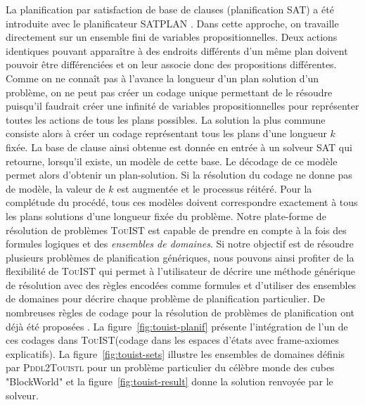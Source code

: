 \documentclass{jfpda2014}
\newcommand{\nameTool}{\textsc{TouIST}\xspace}
\newcommand{\pddlmodule}{\textsc{Pddl2Touistl}\xspace}
\begin{document}
La planification par satisfaction de base de clauses (planification SAT) a été introduite avec le planificateur SATPLAN \citep{kautzS92_planning_sat}. Dans cette approche, on travaille directement sur un ensemble fini de variables propositionnelles. Deux actions identiques pouvant apparaître à des endroits différents d'un même plan doivent pouvoir être différenciées et on leur associe donc des propositions différentes. Comme on ne connaît pas à l'avance la longueur d'un plan solution d'un problème, on ne peut pas créer un codage unique permettant de le résoudre puisqu'il faudrait créer une infinité de variables propositionnelles pour représenter toutes les actions de tous les plans possibles. La solution la plus commune consiste alors à créer un codage représentant tous les plans d'une longueur $k$ fixée. La base de clause ainsi obtenue est donnée en entrée à un solveur SAT qui retourne, lorsqu'il existe, un modèle de cette base. Le décodage de ce modèle permet alors d'obtenir un plan-solution. Si la résolution du codage ne donne pas de modèle, la valeur de $k$ est augmentée et le processus réitéré. Pour la complétude du procédé, tous ces modèles doivent correspondre exactement à tous les plans solutions d'une longueur fixée du problème.
Notre plate-forme de résolution de problèmes \nameTool est capable de prendre en compte à la fois des formules logiques et des \textit{ensembles de domaines}. Si notre objectif est de résoudre plusieurs problèmes de planification génériques, nous pouvons ainsi profiter de la flexibilité de \nameTool qui permet à l'utilisateur de décrire une méthode générique de résolution avec des règles encodées comme formules et d'utiliser des ensembles de domaines pour décrire chaque problème de planification particulier. De nombreuses règles de codage pour la résolution de problèmes de planification ont déjà été proposées \citep{kautzS92_planning_sat,MaliK99_plan_space_encodings,Rintanen:2006}. La figure~\ref{fig:touist-planif} présente l'intégration de l'un de ces codages dans \nameTool (codage dans les espaces d'états avec frame-axiomes explicatifs). La figure~\ref{fig:touist-sets} illustre les ensembles de domaines définis par \pddlmodule pour un problème particulier du célèbre monde des cubes "BlockWorld" et la figure~\ref{fig:touist-result} donne la solution renvoyée par le solveur.
\end{document}

